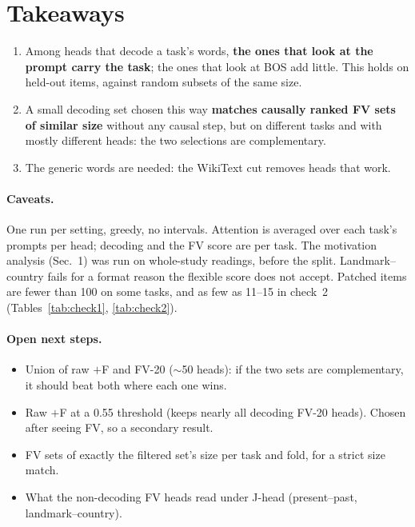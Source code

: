 \documentclass[10pt,a4paper]{article}
\begin{document}
\section{Takeaways}

\begin{enumerate}
\item Among heads that decode a task's words, \textbf{the ones that look at the prompt carry the task}; the ones that look at BOS add little. This holds on held-out items, against random subsets of the same size.
\item A small decoding set chosen this way \textbf{matches causally ranked FV sets of similar size} without any causal step, but on different tasks and with mostly different heads: the two selections are complementary.
\item The generic words are needed: the WikiText cut removes heads that work.
\end{enumerate}

\paragraph{Caveats.} One run per setting, greedy, no intervals. Attention is averaged over each task's prompts per head; decoding and the FV score are per task. The motivation analysis (Sec.~1) was run on whole-study readings, before the split. Landmark--country fails for a format reason the flexible score does not accept. Patched items are fewer than 100 on some tasks, and as few as 11--15 in check~2 (Tables~\ref{tab:check1}, \ref{tab:check2}).

\paragraph{Open next steps.}
\begin{itemize}
\item Union of raw $+$F and FV-20 ($\sim$50 heads): if the two sets are complementary, it should beat both where each one wins.
\item Raw $+$F at a 0.55 threshold (keeps nearly all decoding FV-20 heads). Chosen after seeing FV, so a secondary result.
\item FV sets of exactly the filtered set's size per task and fold, for a strict size match.
\item What the non-decoding FV heads read under J-head (present--past, landmark--country).
\end{itemize}
\end{document}
